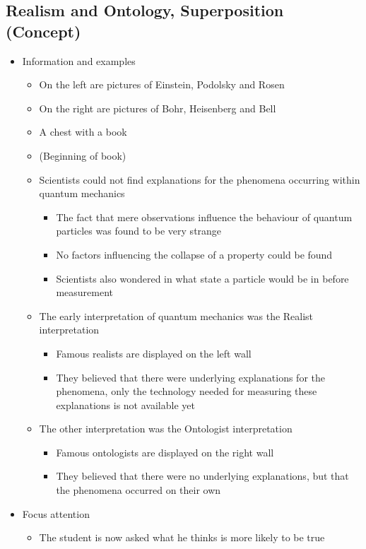 \documentclass[11pt,twoside]{report} %
\begin{document}
\subsection{Realism and Ontology, Superposition (Concept)}
\begin{itemize}
	\item Information and examples
	\begin{itemize}
		\item On the left are pictures of Einstein, Podolsky and Rosen
		\item On the right are pictures of Bohr, Heisenberg and Bell
		\item A chest with a book
		\item (Beginning of book)
		\item Scientists could not find explanations for the phenomena occurring within quantum mechanics
		\begin{itemize}
			\item The fact that mere observations influence the behaviour of quantum particles was found to be very strange
			\item No factors influencing the collapse of a property could be found
			\item Scientists also wondered in what state a particle would be in before measurement
		\end{itemize}
		\item The early interpretation of quantum mechanics was the Realist interpretation
		\begin{itemize}
			\item Famous realists are displayed on the left wall
			\item They believed that there were underlying explanations for the phenomena, only the technology needed for measuring these explanations is not available yet
		\end{itemize}
		\item The other interpretation was the Ontologist interpretation
		\begin{itemize}
			\item Famous ontologists are displayed on the right wall
			\item They believed that there were no underlying explanations, but that the phenomena occurred on their own
		\end{itemize}
	\end{itemize}
	\item Focus attention
	\begin{itemize}
		\item The student is now asked what he thinks is more likely to be true

\end{itemize}
\end{itemize}
\end{document}
